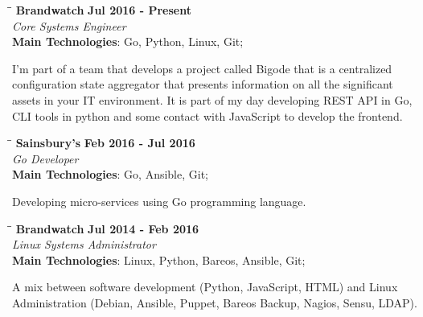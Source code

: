 \documentclass[margin]{res}
\begin{document}
\begin{resume}
\vspace{-0.1in}
   \begin{tabbing}
   \hspace{2.3in}\= \hspace{1.7in}\= \kill %
    \textbf{Brandwatch}    \>\>\textbf{Jul 2016 - Present}\\
    \textit{Core Systems Engineer}\\        
    \textbf{Main Technologies}: Go, Python, Linux, Git;
   \end{tabbing}\vspace{-20pt}      %
    \vspace{2mm}
I'm part of a team that develops a project called Bigode that is a centralized configuration state aggregator that presents information on all the significant assets in your IT environment. It is part of my day developing REST API  in Go, CLI tools in python and some contact with JavaScript to develop the frontend.

\vspace{-0.1in}
   \begin{tabbing}
   \hspace{2.3in}\= \hspace{1.7in}\= \kill %
    \textbf{Sainsbury's}    \>\>\textbf{Feb 2016 - Jul 2016}\\
    \textit{Go Developer}\\        
    \textbf{Main Technologies}: Go, Ansible, Git;
   \end{tabbing}\vspace{-20pt}      %
    \vspace{2mm}
Developing micro-services using Go programming language.

\vspace{-0.1in}
   \begin{tabbing}
   \hspace{2.3in}\= \hspace{1.7in}\= \kill %
    \textbf{Brandwatch}    \>\>\textbf{Jul 2014 - Feb 2016}\\
    \textit{Linux Systems Administrator}\\        
    \textbf{Main Technologies}: Linux, Python, Bareos, Ansible, Git;
   \end{tabbing}\vspace{-20pt}      %
    \vspace{2mm}
A mix between software development (Python, JavaScript, HTML) and Linux Administration (Debian, Ansible, Puppet, Bareos Backup, Nagios, Sensu, LDAP).


\end{resume}
\end{document}
